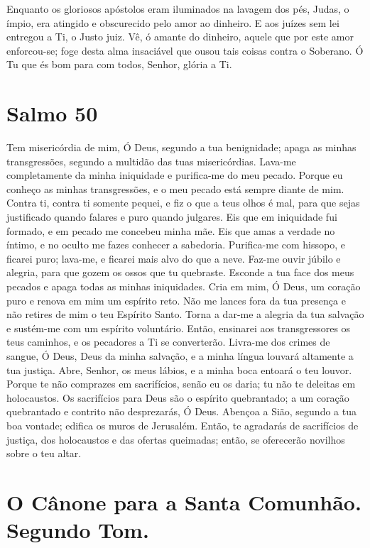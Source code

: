 \documentclass{subfiles}
\begin{document}
Enquanto os gloriosos apóstolos eram iluminados na lavagem dos pés,
Judas, o ímpio, era atingido e obscurecido pelo amor ao dinheiro. E aos juízes
sem lei entregou a Ti, o Justo juiz. Vê, ó amante do dinheiro, aquele que por
este amor enforcou-se; foge desta alma insaciável que ousou tais coisas contra
o Soberano. Ó Tu que és bom para com todos, Senhor, glória a Ti.

\section*{Salmo 50}

Tem misericórdia de mim, Ó Deus, segundo a tua benignidade; apaga
as minhas transgressões, segundo a multidão das tuas misericórdias. Lava-me
completamente da minha iniquidade e purifica-me do meu pecado. Porque eu
conheço as minhas transgressões, e o meu pecado está sempre diante de mim.
Contra ti, contra ti somente pequei, e fiz o que a teus olhos é mal, para que
sejas justificado quando falares e puro quando julgares. Eis que em iniquidade
fui formado, e em pecado me concebeu minha mãe. Eis que amas a verdade
no íntimo, e no oculto me fazes conhecer a sabedoria. Purifica-me com
hissopo, e ficarei puro; lava-me, e ficarei mais alvo do que a neve. Faz-me ouvir
júbilo e alegria, para que gozem os ossos que tu quebraste. Esconde a tua face
dos meus pecados e apaga todas as minhas iniquidades. Cria em mim, Ó Deus,
um coração puro e renova em mim um espírito reto. Não me lances fora da
tua presença e não retires de mim o teu Espírito Santo. Torna a dar-me a
alegria da tua salvação e sustém-me com um espírito voluntário. Então,
ensinarei aos transgressores os teus caminhos, e os pecadores a Ti se
converterão. Livra-me dos crimes de sangue, Ó Deus, Deus da minha salvação,
e a minha língua louvará altamente a tua justiça. Abre, Senhor, os meus lábios,
e a minha boca entoará o teu louvor. Porque te não comprazes em sacrifícios,
senão eu os daria; tu não te deleitas em holocaustos. Os sacrifícios para Deus
são o espírito quebrantado; a um coração quebrantado e contrito não
desprezarás, Ó Deus. Abençoa a Sião, segundo a tua boa vontade; edifica os
muros de Jerusalém. Então, te agradarás de sacrifícios de justiça, dos
holocaustos e das ofertas queimadas; então, se oferecerão novilhos sobre o
teu altar.


\section*{O Cânone para a Santa Comunhão. Segundo Tom.}
\end{document}
